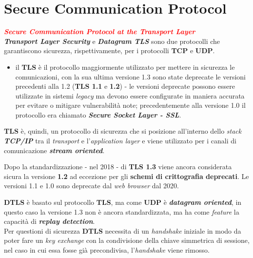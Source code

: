 \chapter{Secure Communication Protocol}

\begin{flushleft}
    \textcolor{red}{\textbf{\textit{Secure Communication Protocol at the Transport Layer}}} \\
    \textbf{\textit{Transport Layer Security}} e \textbf{\textit{Datagram TLS}} sono due protocolli che garantiscono sicurezza, rispettivamente, per i protocolli \textbf{TCP} e \textbf{UDP}.
    \begin{itemize}[nosep]
        \item il \textbf{TLS} è il protocollo maggiormente utilizzato per mettere in sicurezza le comunicazioni, con la sua ultima versione 1.3 sono state deprecate le versioni precedenti alla 1.2 (\textbf{TLS 1.1} e \textbf{1.2}) - le versioni deprecate possono essere utilizzate in sistemi \textit{legacy} ma devono essere configurate in maniera accurata per evitare o mitigare vulnerabilità note; precedentemente alla versione 1.0 il protocollo era chiamato \textbf{\textit{Secure Socket Layer - SSL}}.
    \end{itemize}
    \textbf{TLS} è, quindi, un protocollo di sicurezza che si posizione all'interno dello \textit{stack \textbf{TCP/IP}} tra il \textit{transport} e l'\textit{application layer} e viene utilizzato per i canali di comunicazione \textbf{\textit{stream oriented}}. 

    \smallskip

    Dopo la standardizzazione - nel 2018 - di \textbf{TLS 1.3} viene ancora considerata sicura la versione \textbf{1.2} ad eccezione per gli \textbf{schemi di crittografia deprecati}. Le versioni 1.1 e 1.0 sono deprecate dal \textit{web browser} dal 2020.

    \medskip

    \textbf{DTLS} è basato sul protocollo \textbf{TLS}, ma come \textbf{UDP} è \textbf{\textit{datagram oriented}}, in questo caso la versione 1.3 non è ancora standardizzata, ma ha come \textit{feature} la capacità di \textbf{\textit{replay detection}}. \\
    Per questioni di sicurezza \textbf{DTLS} necessita di un \textit{handshake} iniziale in modo da poter fare un \textit{key exchange} con la condivisione della chiave simmetrica di sessione, nel caso in cui essa fosse già precondivisa, l'\textit{handshake} viene rimosso.
\end{flushleft}

